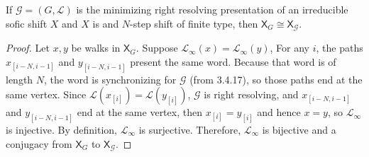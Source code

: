 \documentclass[hidelinks]{article}
\newcommand{\Gc}{\mathcal{G}}  %
\newcommand{\Vc}{\mathcal{V}}
\newcommand{\Ec}{\mathcal{E}}
\newcommand{\shift}[1]{\mathsf{X}_{#1}}
\newcommand{\term}[1]{\textit{#1}}
\theoremstyle{definition}
\begin{document}


    \begin{theorem}
        If \(\mathcal{G} = (G, \mathcal{L})\) is the minimizing right resolving
        presentation of an irreducible sofic shift \(X\) and \(X\) is and
        \(N\)-step shift of finite type, then \(\shift{G} \cong \shift{\Gc}\).
    \end{theorem}
    
    \begin{proof}
        Let \(x, y\) be walks in \(\shift{G}\). Suppose \(\mathcal{L}_\infty(x)=\mathcal{L}_\infty(y)\),
        For any \(i\), the paths \(x_{[i-N, i-1]}\) and \(y_{[i-N, i-1]}\) present 
        the same word. Because that word is of length \(N\), the word is synchronizing
        for \(\mathcal{G}\) (from 3.4.17), so those paths end at the same vertex. Since
        \(\mathcal{L}(x_{[i]}) = \mathcal{L}(y_{[i]})\), \(\mathcal{G}\) is right 
        resolving, and \(x_{[i-N, i-1]}\) and \(y_{[i-N, i-1]}\) end at the same vertex,
        then \(x_{[i]} = y_{[i]}\) and hence \(x = y\), so \(\mathcal{L}_\infty\) is injective.
        By definition, \(\mathcal{L}_\infty\) is surjective. Therefore, \(\mathcal{L}_\infty\) is bijective and 
        a conjugacy from \(\mathsf{X}_G\) to \(\mathsf{X}_\mathcal{G}\).
    \end{proof}




\end{document}
